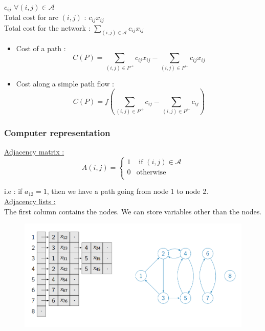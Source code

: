 \documentclass[../main.tex]{subfiles}
\begin{document}
$c_{ij}$ $\forall (i,j) \in \mathcal{A}$\\

Total cost for arc $(i,j)$ : $c_{ij} x_{ij}$\\

Total cost for the network : $\sum_{(i,j)\in \mathcal{A}} c_{ij}x_{ij}$\\

\begin{itemize}
    \item Cost of a path : \begin{equation}
        C(P) = \sum_{(i,j)\in P^\rightarrow}c_{ij}x_{ij} - \sum_{(i,j)\in P^\leftarrow}c_{ij}x_{ij}
    \end{equation}
    \item Cost along a simple path flow : \begin{equation}
        C(P) = f(\sum_{(i,j)\in P^\rightarrow}c_{ij} - \sum_{(i,j)\in P^\leftarrow}c_{ij})
    \end{equation}
\end{itemize}

\subsubsection{Computer representation}
\quad \underline{Adjacency matrix :}\\
\begin{equation}
    A(i,j) = \begin{cases}
        1 & \text{ if } (i,j) \in \mathcal{A}\\
        0 & \text{otherwise}\\
    \end{cases}
\end{equation}

i.e : if $a_{12}=1$, then we have a path going from node 1 to node 2.\\

\quad \underline{Adjacency lists :}\\
The first column contains the nodes. We can store variables other than the nodes.\\

\begin{figure}[hbt!]
    \centering
    \includegraphics[width=.7\textwidth]{IMAGES/opti/optinetwork.png}
\end{figure}
\end{document}
